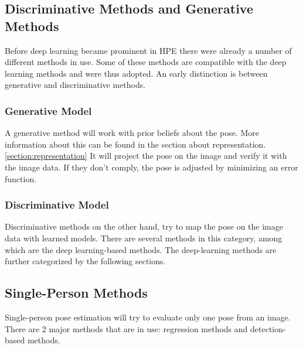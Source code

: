 \subsection{Discriminative Methods and Generative Methods}
Before deep learning became prominent in \gls{HPE} there were already a number of different methods in use.
Some of these methods are compatible with the deep learning methods and were thus adopted.
An early distinction is between generative and discriminative methods.

\subsubsection{Generative Model}
A generative method will work with prior beliefs about the pose.
More information about this can be found in the section about representation.\ref{section:representation}
It will project the pose on the image and verify it with the image data.
If they don't comply, the pose is adjusted by minimizing an error function.\cite{Pons-Moll2011}

\subsubsection{Discriminative Model}
Discriminative methods on the other hand, try to map the pose on the image data with learned models.
There are several methods in this category, among which are the deep learning-based methods.
The deep-learning methods are further categorized by the following sections.

\subsection{Single-Person Methods}
Single-person pose estimation will try to evaluate only one pose from an image.
There are 2 major methods that are in use: regression methods and detection-based methods.

